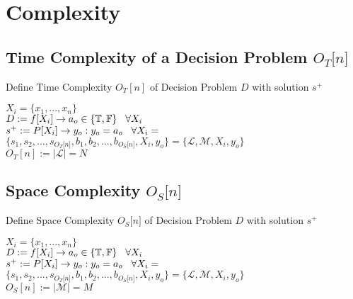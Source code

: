\documentclass[11pt]{article}
\begin{document}
\section{Complexity}

\subsection{Time Complexity of a Decision Problem $O_T \lbrack n \rbrack$}
Define Time Complexity $O_T [n]$ of Decision Problem $D$ with solution $s^+$
\begin{center}
$
X_i = \{x_1,...,x_n\}
$
\\ \vspace{2mm}
$
D := f \lbrack X_i \rbrack \rightarrow a_{o} \in \{\mathbb{T}, \mathbb{F}\} \hspace{3mm} \forall X_i
$
\\ \vspace{2mm}
$
s^+ := P \lbrack X_i \rbrack \rightarrow y_{o} : y_o = a_{o} \hspace{3mm} \forall X_i = 
$
\\ \vspace{2mm}
$
\{ s_1,s_2,...,s_{O_T \lbrack n \rbrack }, b_1, b_2,...,b_{O_S \lbrack n \rbrack},X_i,y_o \} = \{ \mathcal{L},\mathcal{M},X_i,y_o\}
$
\\ \vspace{3mm}
$
O_T[n] := |\mathcal{L}| = N
$
\end{center}

\subsection{Space Complexity $O_S \lbrack n \rbrack$}
Define Space Complexity $O_S \lbrack n \rbrack$ of Decision Problem $D$ with solution $s^+$
\begin{center}
$
X_i = \{x_1,...,x_n\}
$
\\ \vspace{2mm}
$
D := f \lbrack X_i \rbrack \rightarrow a_{o} \in \{\mathbb{T}, \mathbb{F}\} \hspace{3mm} \forall X_i
$
\\ \vspace{2mm}
$
s^+ := P \lbrack X_i \rbrack \rightarrow y_{o} : y_o = a_{o} \hspace{3mm} \forall X_i =
$
\\ \vspace{2mm}
$
\{ s_1,s_2,...,s_{O_T \lbrack n \rbrack }, b_1, b_2,...,b_{O_S \lbrack n \rbrack},X_i,y_o \} = \{ \mathcal{L},\mathcal{M},X_i,y_o\}
$
\\ \vspace{2mm}
$
O_S[n] := |\mathcal{M}| = M
$
\end{center}
\end{document}
